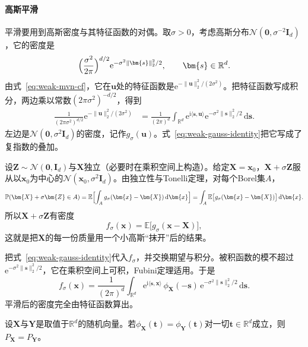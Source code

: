 \paragraph{高斯平滑}
平滑要用到高斯密度与其特征函数的对偶。取$\sigma>0$，考虑高斯分布$\mathcal{N}(\bm{0},\sigma^{-2}\bm{I}_d)$，它的密度是
\[
 \Bigl(\frac{\sigma^{2}}{2\pi}\Bigr)^{d/2}\mathrm{e}^{-\sigma^{2}\lVert\bm{s}\rVert_2^{2}/2},\qquad\bm{s}\in\mathbb{R}^{d} .
\]
由式~\eqref{eq:weak-mvn-cf}，它在$\bm{u}$处的特征函数是$\mathrm{e}^{-\lVert\bm{u}\rVert_2^{2}/(2\sigma^{2})}$。把特征函数写成积分，两边乘以常数$(2\pi\sigma^{2})^{-d/2}$，得到
\begin{equation}
 \begin{aligned}
 \frac{1}{(2\pi\sigma^{2})^{d/2}}\mathrm{e}^{-\lVert\bm{u}\rVert_2^{2}/(2\sigma^{2})}
 &=\frac{1}{(2\pi)^{d}}\int_{\mathbb{R}^{d}}\mathrm{e}^{\mathrm{i}\langle\bm{s},\bm{u}\rangle}\mathrm{e}^{-\sigma^{2}\lVert\bm{s}\rVert_2^{2}/2}\,\mathrm{d}\bm{s} .
 \end{aligned}
 \label{eq:weak-gauss-identity}
\end{equation}
左边是$\mathcal{N}(\bm{0},\sigma^{2}\bm{I}_d)$的密度，记作$g_{\sigma}(\bm{u})$。式~\eqref{eq:weak-gauss-identity}把它写成了复指数的叠加。

设$\bm{Z}\sim\mathcal{N}(\bm{0},\bm{I}_d)$与$\bm{X}$独立（必要时在乘积空间上构造）。给定$\bm{X}=\bm{x}_0$，$\bm{X}+\sigma\bm{Z}$服从以$\bm{x}_0$为中心的$\mathcal{N}(\bm{x}_0,\sigma^{2}\bm{I}_d)$。由独立性与Tonelli定理，对每个Borel集$A$，
\[
 \mathbb{P}(\bm{X}+\sigma\bm{Z}\in A)=\mathbb{E}\Bigl[\int_Ag_{\sigma}(\bm{x}-\bm{X})\,\mathrm{d}\bm{x}\Bigr]=\int_A\mathbb{E}\bigl[g_{\sigma}(\bm{x}-\bm{X})\bigr]\,\mathrm{d}\bm{x} .
\]
所以$\bm{X}+\sigma\bm{Z}$有密度
\[
 f_{\sigma}(\bm{x})=\mathbb{E}\bigl[g_{\sigma}(\bm{x}-\bm{X})\bigr] ,
\]
这就是把$\bm{X}$的每一份质量用一个小高斯“抹开”后的结果。

把式~\eqref{eq:weak-gauss-identity}代入$f_{\sigma}$，并交换期望与积分。被积函数的模不超过$\mathrm{e}^{-\sigma^{2}\lVert\bm{s}\rVert_2^{2}/2}$，它在乘积空间上可积，Fubini定理适用。于是
\begin{equation}
 f_{\sigma}(\bm{x})=\frac{1}{(2\pi)^{d}}\int_{\mathbb{R}^{d}}\mathrm{e}^{\mathrm{i}\langle\bm{s},\bm{x}\rangle}\,\phi_{\bm{X}}(-\bm{s})\,\mathrm{e}^{-\sigma^{2}\lVert\bm{s}\rVert_2^{2}/2}\,\mathrm{d}\bm{s} .
 \label{eq:weak-smoothed-density}
\end{equation}
平滑后的密度完全由特征函数算出。

\begin{theorem}[特征函数确定分布]
\label{thm:weak-cf-uniqueness}
设$\bm{X}$与$\bm{Y}$是取值于$\mathbb{R}^{d}$的随机向量。若$\phi_{\bm{X}}(\bm{t})=\phi_{\bm{Y}}(\bm{t})$对一切$\bm{t}\in\mathbb{R}^{d}$成立，则$P_{\bm{X}}=P_{\bm{Y}}$。
\end{theorem}

